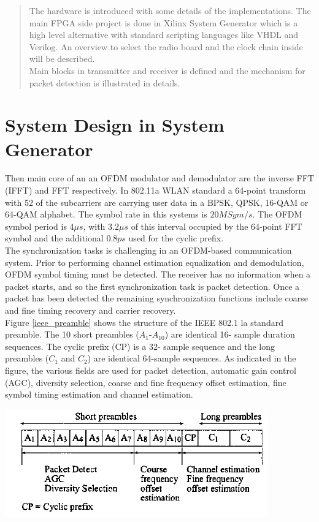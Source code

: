 \begin{abstract}
The hardware is introduced with some details of the implementations. The main FPGA side project is done in Xilinx System Generator which is a high level alternative with standard scripting languages like VHDL and Verilog. An overview to select the radio board and the clock chain inside will be described.\\
Main blocks in transmitter and receiver is defined and the mechanism for packet detection is illustrated in details.

\end{abstract}

\section{System Design in System Generator}
\label{sec_anasim}

Then main core of an an OFDM modulator and demodulator are the inverse FFT (IFFT) and FFT respectively. In 802.11a WLAN standard a 64-point transform with 52 of the subcarriers are carrying user data in a BPSK,
QPSK, 16-QAM or 64-QAM alphabet. The symbol rate in this systems is $20 MSym/s$. The OFDM symbol period
is $4 \mu s$, with $3.2 \mu s$ of this interval occupied by the 64-point FFT symbol and the additional $0.8 ps$ used for the cyclic prefix.\\

The synchronization tasks is challenging in an OFDM-based communication system. Prior to performing channel estimation equalization and demodulation, OFDM symbol timing must be detected. The receiver has no information when a packet starts, and so the first synchronization task is packet detection. Once a packet has been detected the remaining synchronization functions include coarse and fine timing recovery and carrier recovery.\\
Figure \ref{ieee_preamble} shows the structure of the IEEE 802.1 la standard preamble. The 10 short preambles ($A_{1}$-$A_{10}$) are identical 16- sample duration sequences. The cyclic prefix (CP) is a 32- sample sequence and the long preambles ($C_{1}$ and $C_{2}$) are identical 64-sample sequences. As indicated in the figure, the various fields are used for packet detection, automatic gain control (AGC), diversity selection, coarse and fine frequency offset estimation, fine symbol timing estimation and channel estimation. 

\begin{center}
\includegraphics[width=\textwidth]{content/fig/ieee_preamble.JPG}
\label{ieee_preamble}
\end{center}


